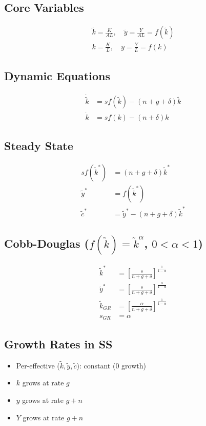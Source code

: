 \documentclass[a4paper,11pt]{article}
\newcommand{\ktilde}{\tilde{k}}
\newcommand{\ytilde}{\tilde{y}}
\newcommand{\ctilde}{\tilde{c}}
\begin{document}
\subsection*{Core Variables}
\begin{align*}
\ktilde = \frac{K}{AL}, \quad \ytilde = \frac{Y}{AL} = f(\ktilde) \\
k = \frac{K}{L}, \quad y = \frac{Y}{L} = f(k)
\end{align*}

\subsection*{Dynamic Equations}
\begin{align*}
\dot{\ktilde} &= s f(\ktilde) - (n+g+\delta)\ktilde \\
\dot{k} &= s f(k) - (n+\delta)k
\end{align*}

\subsection*{Steady State}
\begin{align*}
s f(\ktilde^{*}) &= (n+g+\delta)\ktilde^{*} \\
\ytilde^{*} &= f(\ktilde^{*}) \\
\ctilde^{*} &= \ytilde^{*} - (n+g+\delta)\ktilde^{*}
\end{align*}

\subsection*{Cobb-Douglas ($f(\ktilde) = \ktilde^\alpha$, $0 < \alpha < 1$)}
\begin{align*}
\ktilde^{*} &= \left[\frac{s}{n+g+\delta}\right]^{\frac{1}{1-\alpha}} \\
\ytilde^{*} &= \left[\frac{s}{n+g+\delta}\right]^{\frac{\alpha}{1-\alpha}} \\
\ktilde_{GR} &= \left[\frac{\alpha}{n+g+\delta}\right]^{\frac{1}{1-\alpha}} \\
s_{GR} &= \alpha
\end{align*}

\subsection*{Growth Rates in SS}
\begin{itemize}
    \item Per-effective ($\ktilde, \ytilde, \ctilde$): constant ($0$ growth)
    \item $k$ grows at rate $g$
    \item $y$ grows at rate $g+n$
    \item $Y$ grows at rate $g+n$
\end{itemize}
\end{document}
